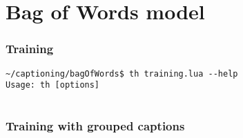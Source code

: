 \section{Bag of Words model}

\subsubsection{Training}

\begin{lstlisting}[firstnumber=1,breakindent=75pt]
~/captioning/bagOfWords$ th training.lua --help
Usage: th [options] 


\end{lstlisting}
\hspace{1cm}


\subsubsection{Training with grouped captions}



